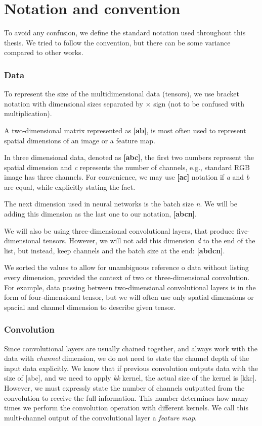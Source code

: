 \section{Notation and convention}
\label{sec:notation}
To avoid any confusion, we define the standard notation used throughout this thesis. We tried to follow the convention, but there can be some variance compared to other works.

\subsubsection*{Data}

To represent the size of the multidimensional data (tensors), we use bracket notation with dimensional sizes separated by $\times $ sign (not to be confused with multiplication).

A two-dimensional matrix represented as \textbf{[a\x b]}, is most often used to represent spatial dimensions of an image or a feature map. 

In three dimensional data, denoted as \textbf{[a\x b\x c]}, the first two numbers represent the spatial dimension and \textit{c} represents the number of channels, e.g., standard RGB image has three channels. For convenience, we may use \textbf{[a\x c]} notation if \textit{a} and \textit{b} are equal, while explicitly stating the fact.

The next dimension used in neural networks is the batch size \textit{n}. We will be adding this dimension as the last one to our notation, \textbf{[a\x b\x c\x n]}.

We will also be using three-dimensional convolutional layers, that produce five-dimensional tensors. However, we will not add this dimension \textit{d} to the end of the list, but instead, keep channels and the batch size at the end: \textbf{[a\x b\x d\x c\x n]}. 

We sorted the values to allow for unambiguous reference o data without listing every dimension, provided the context of two or three-dimensional convolution. For example, data passing between two-dimensional convolutional layers is in the form of four-dimensional tensor, but we will often use only spatial dimensions or spacial and channel dimension to describe given tensor.

\subsubsection*{Convolution}
Since convolutional layers are usually chained together, and always work with the data with \textit{channel} dimension, we do not need to state the channel depth of the input data explicitly. We know that if previous convolution outputs data with the size of [a\x b\x c], and we need to apply \textit{k\x k} kernel, the actual size of the kernel is [k\x k\x c]. However, we must expressly state the number of channels outputted from the convolution to receive the full information. This number determines how many times we perform the convolution operation with different kernels. We call this multi-channel output of the convolutional layer a \textit{feature map}.

